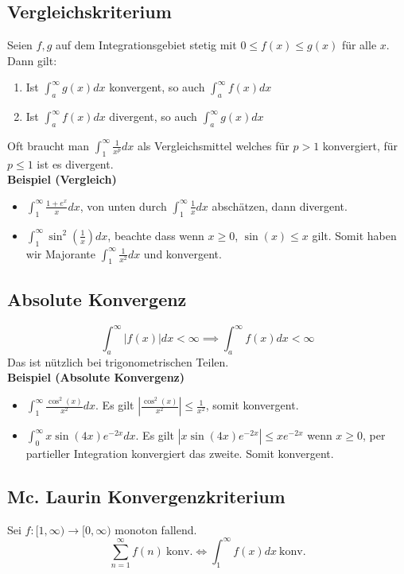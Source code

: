 \documentclass[25pt]{sciposter}
\begin{document}
\begin{multicols}{3}
\subsection*{Vergleichskriterium}
 Seien $f,g$ auf dem Integrationsgebiet stetig mit $0 \leq f(x) \leq g(x)$ für alle $x$. Dann gilt:
 \begin{enumerate}
 	\item Ist $\int_{a}^{\infty} g(x) dx$ konvergent, so auch $\int_{a}^{\infty} f(x) dx$
 	\item Ist $\int_{a}^{\infty} f(x) dx$ divergent, so auch $\int_{a}^{\infty} g(x) dx$
 \end{enumerate}
 Oft braucht man $\int_{1}^{\infty} \frac{1}{x^p} dx$ als Vergleichsmittel welches für $p>1$ konvergiert, für $p \leq 1$ ist es divergent.\\
\textbf{Beispiel (Vergleich)} 
\begin{itemize}
	\item $\int_{1}^{\infty} \frac{1 + e^x}{x} dx$, von unten durch $\int_{1}^{\infty} \frac{1}{x} dx$ abschätzen, dann divergent.
	\item $\int_1 ^\infty \sin^2\left(\frac{1}{x}\right) dx$, beachte dass wenn $x \geq 0$, $\sin(x) \leq x$ gilt. Somit haben wir Majorante $\int_{1}^{\infty} \frac{1}{x^2} dx$ und konvergent. 
\end{itemize}


\subsection*{Absolute Konvergenz}
$$ \int_{a}^{\infty} \left| f(x) \right| dx <\infty \implies \int_{a}^{\infty}f(x) dx < \infty $$
Das ist nützlich bei trigonometrischen Teilen.\\
\textbf{Beispiel (Absolute Konvergenz)} 
\begin{itemize}
	\item $\int_{1}^{\infty} \frac{\cos^2(x)}{x^2} dx$. Es gilt $\left| \frac{\cos^2(x)}{x^2}\right|\leq \frac{1}{x^2}$, somit konvergent.
	\item $\int_0 ^\infty x\sin(4x)e^{-2x} dx$. Es gilt $|x\sin(4x)e^{-2x}| \leq xe^{-2x}$ wenn $x\geq 0$, per partieller Integration konvergiert das zweite. Somit konvergent.
\end{itemize}

\subsection*{Mc. Laurin Konvergenzkriterium}
Sei $f:[1,\infty) \to [0,\infty)$ monoton fallend.
$$\sum_{n=1}^{\infty} f(n) \ \text{konv.}  \iff    \int_{1}^{\infty} f(x) dx \ \text{konv.}$$





\end{multicols}
\end{document}
